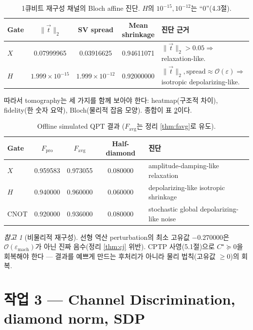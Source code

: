 \documentclass[11pt,a4paper]{article}
\theoremstyle{definition}
\theoremstyle{plain}
\theoremstyle{remark}
\newtheorem*{remark}{참고}
\begin{document}
\begin{table}[H]
\centering\small
\begin{tabularx}{\textwidth}{lcccX}
\toprule
Gate & $\|\vec t\|_2$ & SV spread & Mean shrinkage & 진단 근거 \\
\midrule
$X$ & 0.07999965 & 0.03916625 & 0.94611071 & $\|\vec t\|_2>0.05\Rightarrow$ relaxation-like. \\
$H$ & $1.999\times10^{-15}$ & $1.999\times10^{-12}$ & 0.92000000 & $\|\vec t\|_2,\mathrm{spread}\approx\mathcal O(\varepsilon)\Rightarrow$ isotropic depolarizing-like. \\
\bottomrule
\end{tabularx}
\caption{1큐비트 재구성 채널의 Bloch affine 진단. $H$의 $10^{-15},10^{-12}$는 ``$0$''(4.3절).}
\label{tab:qpt-bloch-diagnostics}
\end{table}

따라서 tomography는 세 가지를 함께 보아야 한다: heatmap(구조적 차이), fidelity(한 숫자 요약), Bloch(물리적 잡음 모양). 종합이 표 \ref{tab:qpt-results}이다.

\begin{table}[H]
\centering\small
\begin{tabularx}{\textwidth}{lcccX}
\toprule
Gate & $F_{\mathrm{pro}}$ & $F_{\mathrm{avg}}$ & Half-diamond & 진단 \\
\midrule
$X$ & 0.959583 & 0.973055 & 0.080000 & amplitude-damping-like relaxation \\
$H$ & 0.940000 & 0.960000 & 0.060000 & depolarizing-like isotropic shrinkage \\
CNOT & 0.920000 & 0.936000 & 0.080000 & stochastic global depolarizing-like noise \\
\bottomrule
\end{tabularx}
\caption{Offline simulated QPT 결과 ($F_{\mathrm{avg}}$는 정리 \ref{thm:favg}로 유도).}
\label{tab:qpt-results}
\end{table}

\begin{remark}[비물리적 재구성]
선형 역산 perturbation의 최소 고유값 $-0.270000$은 $\mathcal O(\varepsilon_{\mathrm{mach}})$가 아닌 진짜 음수(정리 \ref{thm:cj} 위반). CPTP 사영(5.1절)으로 $C^\star\succeq0$을 회복해야 한다 --- 결과를 예쁘게 만드는 후처리가 아니라 물리 법칙(고유값 $\ge0$)의 회복.
\end{remark}

\section{작업 3 --- Channel Discrimination, diamond norm, SDP}
\end{document}
